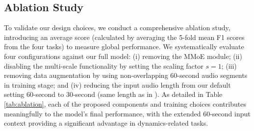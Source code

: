 \documentclass{article}
\begin{document}
\subsection{Ablation Study}
To validate our design choices, we conduct a comprehensive ablation study, introducing an average score (calculated by averaging the 5-fold mean F1 scores from the four tasks) to measure global performance. We systematically evaluate four configurations against our full model: (i) removing the MMoE module; (ii) disabling the multi-scale functionality by setting the scaling factor $s=1$; (iii) removing data augmentation by using non-overlapping 60-second audio segments in training stage; and (iv) reducing the input audio length from our default setting 60-second to 30-second (same length as in \cite{foscarin2024beat}). As detailed in Table \ref{tab:ablation}, each of the proposed components and training choices contributes meaningfully to the model's final performance, with the extended 60-second input context providing a significant advantage in dynamics-related tasks.
\end{document}

